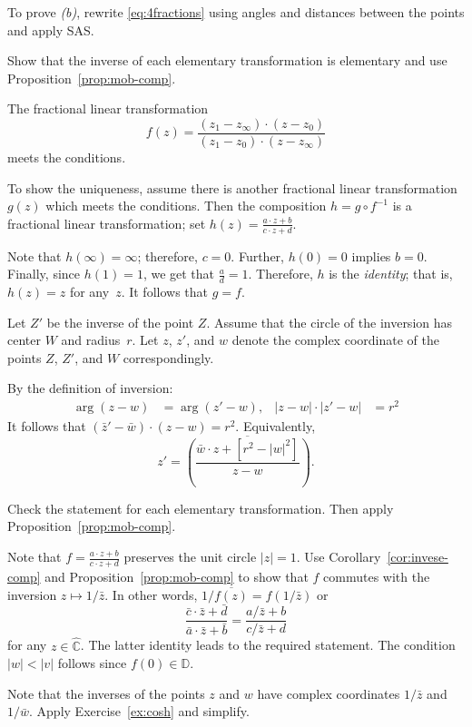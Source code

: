 To prove \textit{(b)}, rewrite \ref{eq:4fractions} using angles and distances between the points and apply SAS.

Show that the inverse of each elementary transformation is elementary
and use Proposition~\ref{prop:mob-comp}.

The fractional linear transformation
\[f(z)=\frac{(z_1-z_\infty)\cdot(z-z_0)}{(z_1-z_0)\cdot(z-z_\infty)}\]
meets the conditions.

To show the uniqueness, assume there is another fractional linear transformation
$g(z)$ which meets the conditions.
Then the composition
$h=g\circ f^{-1}$ 
is a fractional linear transformation; set
$h(z)=\tfrac{a\cdot z+b}{c\cdot z+d}$.

Note that $h(\infty)=\infty$;
therefore, $c=0$.
Further, $h(0)=0$ implies $b=0$.
Finally, since $h(1)=1$, we get that $\tfrac ad=1$.
Therefore, $h$ is the \emph{identity};
that is, $h(z)=z$ for any~$z$.
It follows that $g=f$.

Let $Z'$ be the inverse of the point $Z$.
Assume that the circle of the inversion has center $W$ and radius~$r$.
Let $z$, $z'$, and $w$ denote the complex coordinate of the points $Z$, $Z'$, and $W$ correspondingly.

By the definition of inversion:
\begin{align*}
\arg (z-w)&=\arg (z'-w),
&
|z-w|\cdot|z'-w|&=r^2
\end{align*}
It follows that $(\bar z'-\bar w)\cdot ( z- w)= r^2$.
Equivalently,
\[z'=\overline{\left(\frac{\bar w\cdot z+[r^2-|w|^2]}{z- w}\right)}.\]

 
Check the statement for each elementary transformation.
Then apply Proposition~\ref{prop:mob-comp}.

Note that $f=\tfrac{a\cdot z+b}{c\cdot z+d}$ preserves the unit circle $|z|=1$.
Use Corollary~\ref{cor:invese-comp} and Proposition~\ref{prop:mob-comp} to show that $f$ commutes with the inversion $z\mapsto 1/\bar z$.
In other words, $1/\overline{f(z)}=f(1/\bar z)$ or
\[\frac{\bar c\cdot \bar z+\bar d}{\bar a\cdot \bar z+\bar b}
=\frac{a/\bar z+b}{c/\bar z+d}\]
for any $z\in\hat{\mathbb{C}}$.
The latter identity leads to the required statement. 
The condition $|w|<|v|$ follows since $f(0)\in\mathbb{D}$.

Note that the inverses of the points $z$ and $w$ have complex coordinates $1/\bar z$ and $1/\bar w$.
Apply Exercise~\ref{ex:cosh} and simplify.

